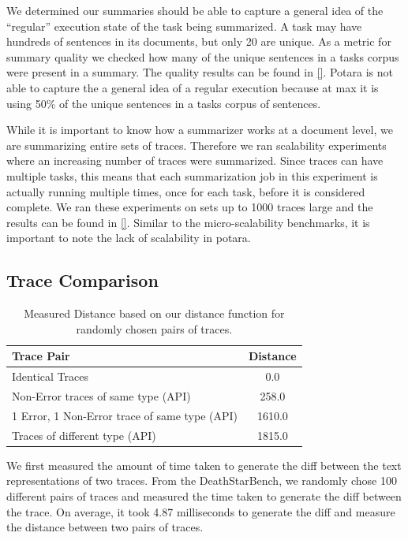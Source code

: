  We determined our summaries should be able to capture a general idea of the ``regular'' execution state of the task being summarized. 
A task may have hundreds of sentences in its documents, but only 20 are unique. As a metric for summary quality
we checked how many of the unique sentences in a tasks corpus were present in a summary. The quality results can be found in \autoref{}. Potara is not able to capture 
the a general idea of a regular execution because at max it is using 50\% of the unique sentences in a tasks corpus of sentences. 

 While it is important to know how a summarizer works at a document level, we are summarizing entire sets of traces. Therefore
we ran scalability experiments where an increasing number of traces were summarized. Since traces can have multiple tasks, this means that each summarization job 
in this experiment is actually running multiple times, once for each task, before it is considered complete. We ran these experiments on sets up to 1000 traces large and the 
results can be found in \autoref{}. Similar to the micro-scalability benchmarks, it is important to note the lack of scalability in potara. 

\subsection{Trace Comparison}

\begin{table}[]
    \begin{tabular}{|l|c|}
    \hline
    Trace Pair                              & Distance \\
    \hline
    \hline
    Identical Traces                        & 0.0      \\
    \hline
    Non-Error traces of same type (API)     & 258.0    \\
    \hline
    1 Error, 1 Non-Error trace of same type (API) & 1610.0  \\
    \hline
    Traces of different type (API)          & 1815.0   \\
    \hline
    \end{tabular}
    \caption{Measured Distance based on our distance function for randomly chosen pairs of traces.}
    \label{tab:comparison_dist}
\end{table}

 We first measured the amount of time taken to generate the diff between the text representations
of two traces. From the DeathStarBench, we randomly chose 100 different pairs of traces and measured the time taken
to generate the diff between the trace. On average, it took 4.87 milliseconds to generate the diff and measure the distance
between two pairs of traces.

